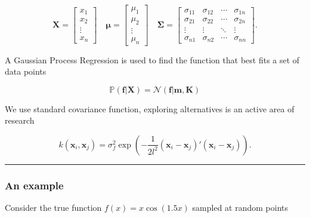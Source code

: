 \documentclass[
  letterpaper,
  DIV=11,
  numbers=noendperiod]{scrartcl}
\begin{document}
\[\begin{equation}
\mathbf{X} = \begin{bmatrix}
    x_1    \\
    x_2    \\
    \vdots \\
    x_n
  \end{bmatrix}
  \quad
  \mathbf{\mu} = \begin{bmatrix}
    \mu_1  \\
    \mu_2  \\
    \vdots \\
    \mu_n
  \end{bmatrix}
  \quad
  \mathbf{\Sigma} = \begin{bmatrix}
    \sigma_{11} & \sigma_{12} & \cdots & \sigma_{1n} \\
    \sigma_{21} & \sigma_{22} & \cdots & \sigma_{2n} \\
    \vdots      & \vdots      & \ddots & \vdots      \\
    \sigma_{n1} & \sigma_{n2} & \cdots & \sigma_{nn}
  \end{bmatrix}.
\end{equation}\]

A Gaussian Process Regression is used to find the function that best
fits a set of data points

\[\begin{equation}
\mathbb{P}(\mathbf{f} | \mathbf{X}) = \mathcal{N}(\mathbf{f} | \mathbf{m}, \mathbf{K})
\end{equation}\]

We use standard covariance function, exploring alternatives is an active
area of research

\[\begin{equation}
k(\mathbf{x}_i, \mathbf{x}_j) = \sigma^2_f \exp\left(-\frac{1}{2l^2} (\mathbf{x}_i - \mathbf{x}_j)' (\mathbf{x}_i - \mathbf{x}_j)\right).
\end{equation}\]

\begin{center}\rule{0.5\linewidth}{0.5pt}\end{center}

\hypertarget{an-example}{%
\subsubsection{An example}\label{an-example}}

Consider the true function \(f(x) = x \cos(1.5x)\) sampled at random
points
\end{document}
